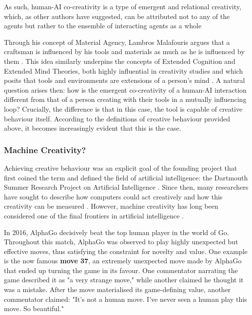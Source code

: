 As such, human-AI co-creativity is a type of emergent and relational creativity, which, as other authors have suggested, can be attributed not to any of the agents but rather to the ensemble of interacting agents as a whole \cite{Davis2013-jy, Rezwana2023-rt}

Through his concept of Material Agency, Lambros Malafouris argues that a craftsman is influenced by his tools and materials as much as he is influenced by them \cite{Malafouris2013-by}. This idea similarly underpins the concepts of Extended Cognition and Extended Mind Theories, both highly influential in creativity studies and which posits that tools and environments are extensions of a person's mind \cite{Clark1998-yi}. A natural question arises then: how is the emergent co-creativity of a human-AI interaction different from that of a person creating with their tools in a mutually influencing loop? Crucially, the difference is that in this case, the tool is capable of creative behaviour itself. According to the definitions of creative behaviour provided above, it becomes increasingly evident that this is the case. 

\subsubsection{Machine Creativity?}

Achieving creative behaviour was an explicit goal of the founding project that first coined the term and defined the field of artificial intelligence: the Dartmouth Summer Research Project on Artificial Intelligence \cite{McCarthy1955-ls}. Since then,  many researchers have sought to describe how computers could act creatively and how this creativity can be measured \cite{Boden2003-hk, Boden1998-yn, Colton2012-jc, Bown2012-gg, Moruzzi2020-mw, Wiggins2006-zd, Jordanous2012-kw}. However, machine creativity has long been considered one of the final frontiers in artificial intelligence \cite{Colton2021-bt}.

In 2016, AlphaGo decisively beat the top human player in the world of Go. Throughout this match, AlphaGo was observed to play highly unexpected but effective moves, thus satisfying the constraint for novelty and value. One example is the now famous \textbf{move 37}, an extremely unexpected move made by AlphaGo that ended up turning the game in its favour. One commentator narrating the game described it as "a very strange move," while another claimed he thought it was a mistake. After the move materialised its game-defining value, another commentator claimed: "It's not a human move. I've never seen a human play this move. So beautiful."

